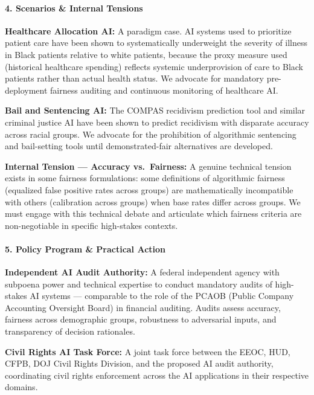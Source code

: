 \paragraph{4. Scenarios \& Internal
Tensions}\label{scenarios-internal-tensions-10}

\textbf{Healthcare Allocation AI:} A paradigm case. AI systems used to
prioritize patient care have been shown to systematically underweight
the severity of illness in Black patients relative to white patients,
because the proxy measure used (historical healthcare spending) reflects
systemic underprovision of care to Black patients rather than actual
health status. We advocate for mandatory pre-deployment fairness
auditing and continuous monitoring of healthcare AI.

\textbf{Bail and Sentencing AI:} The COMPAS recidivism prediction tool
and similar criminal justice AI have been shown to predict recidivism
with disparate accuracy across racial groups. We advocate for the
prohibition of algorithmic sentencing and bail-setting tools until
demonstrated-fair alternatives are developed.

\textbf{Internal Tension --- Accuracy vs.~Fairness:} A genuine technical
tension exists in some fairness formulations: some definitions of
algorithmic fairness (equalized false positive rates across groups) are
mathematically incompatible with others (calibration across groups) when
base rates differ across groups. We must engage with this technical
debate and articulate which fairness criteria are non-negotiable in
specific high-stakes contexts.

\paragraph{5. Policy Program \& Practical
Action}\label{policy-program-practical-action-10}

\textbf{Independent AI Audit Authority:} A federal independent agency
with subpoena power and technical expertise to conduct mandatory audits
of high-stakes AI systems --- comparable to the role of the PCAOB
(Public Company Accounting Oversight Board) in financial auditing.
Audits assess accuracy, fairness across demographic groups, robustness
to adversarial inputs, and transparency of decision rationales.

\textbf{Civil Rights AI Task Force:} A joint task force between the
EEOC, HUD, CFPB, DOJ Civil Rights Division, and the proposed AI audit
authority, coordinating civil rights enforcement across the AI
applications in their respective domains.

